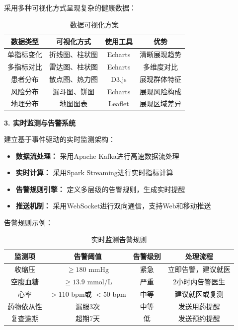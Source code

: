 采用多种可视化方式呈现复杂的健康数据：

\begin{table}[H]
  \centering
  \caption{数据可视化方案}
  \label{tab:visualization}
  \begin{tabularx}{\textwidth}{CCCC}
    \toprule
    数据类型 & 可视化方式 & 使用工具 & 优势 \\
    \midrule
    单指标变化 & 折线图、柱状图 & Echarts & 清晰展现趋势 \\
    多指标对比 & 雷达图、柱状图 & Echarts & 多维度对比 \\
    患者分布 & 散点图、热力图 & D3.js & 展现群体特征 \\
    风险分布 & 漏斗图、饼图 & Echarts & 展现风险构成 \\
    地理分布 & 地图图表 & Leaflet & 展现区域差异 \\
    \bottomrule
  \end{tabularx}
\end{table}

\textbf{3. 实时监测与告警系统}

建立基于事件驱动的实时监测架构：

\begin{itemize}[itemindent=2em]
\item \textbf{数据流处理：} 采用Apache Kafka进行高速数据流处理
\item \textbf{实时计算：} 采用Spark Streaming进行实时指标计算
\item \textbf{告警规则引擎：} 定义多层级的告警规则，生成实时提醒
\item \textbf{推送机制：} 采用WebSocket进行双向通信，支持Web和移动推送
\end{itemize}

告警规则示例：

\begin{table}[H]
  \centering
  \caption{实时监测告警规则}
  \label{tab:alarm_rules}
  \begin{tabularx}{\textwidth}{CCCC}
    \toprule
    监测项 & 告警阈值 & 告警级别 & 处理流程 \\
    \midrule
    收缩压 & $\geq 180$ mmHg & 紧急 & 立即告警，建议就医 \\
    空腹血糖 & $\geq 13.9$ mmol/L & 严重 & 2小时内告警医生 \\
    心率 & $>110$ bpm或 $<50$ bpm & 中等 & 建议就医或复测 \\
    药物依从性 & 漏服3次 & 中等 & 发送用药提醒 \\
    复查逾期 & 超期7天 & 低 & 发送预约提醒 \\
    \bottomrule
  \end{tabularx}
\end{table}

